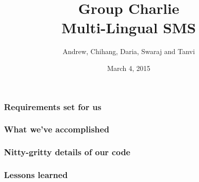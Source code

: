 \documentclass{beamer}
\title{Group Charlie\\Multi-Lingual SMS}
\author{Andrew, Chihang, Daria, Swaraj and Tanvi}
\institute{University of Cambridge}
\date{March 4, 2015}
\begin{document}
\maketitle

\begin{frame}
\frametitle{Requirements set for us}
\end{frame}

\begin{frame}
\frametitle{What we've accomplished}
\end{frame}

\begin{frame}
\frametitle{Nitty-gritty details of our code}
\end{frame}

\begin{frame}
\frametitle{Lessons learned}
\end{frame}
\end{document}
